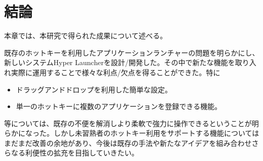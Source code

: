 \chapter{結論}
本章では、本研究で得られた成果について述べる。

\newpage

既存のホットキーを利用したアプリケーションランチャーの問題を明らかにし、新しいシステムHyper Launcherを設計/開発した。その中で新たな機能を取り入れ実際に運用することで様々な利点/欠点を得ることができた。特に
\begin{itemize}
  \item ドラッグアンドドロップを利用した簡単な設定。
  \item 単一のホットキーに複数のアプリケーションを登録できる機能。
\end{itemize}
等については、既存の不便を解消しより柔軟で強力に操作できるということが明らかになった。しかし未習熟者のホットキー利用をサポートする機能についてはまだまだ改善の余地があり、今後は既存の手法や新たなアイデアを組み合わせさらなる利便性の拡充を目指していきたい。